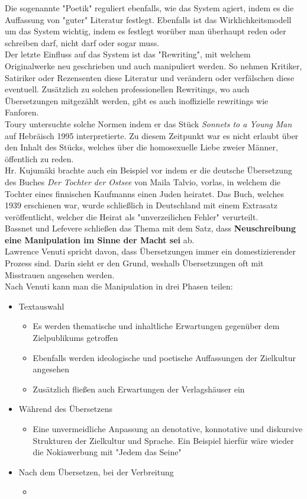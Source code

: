 \documentclass{article}
\begin{document}
	Die sogenannte "Poetik" reguliert ebenfalls, wie das System agiert, indem es die Auffassung von "guter" Literatur festlegt. Ebenfalls ist das Wirklichkeitsmodell um das System wichtig, indem es festlegt worüber man überhaupt reden oder schreiben darf, nicht darf oder sogar muss. \\
	Der letzte Einfluss auf das System ist das "Rewriting", mit welchem Originalwerke neu geschrieben und auch manipuliert werden. So nehmen Kritiker, Satiriker oder Rezensenten diese Literatur und verändern oder verfälschen diese eventuell. Zusätzlich zu solchen professionellen Rewritings, wo auch Übersetzungen mitgezählt werden, gibt es auch inoffizielle rewritings wie Fanforen. \\
	Toury untersuchte solche Normen indem er das Stück \textit{Sonnets to a Young Man} auf Hebräisch 1995 interpretierte. Zu diesem Zeitpunkt war es nicht erlaubt über den Inhalt des Stücks, welches über die homosexuelle Liebe zweier Männer, öffentlich zu reden. \\
	Hr. Kujumäki brachte auch ein Beispiel vor indem er die deutsche Übersetzung des Buches \textit{Der Tochter der Ostsee} von Maila Talvio, vorlas, in welchem die Tochter eines finnischen Kaufmanns einen Juden heiratet. Das Buch, welches 1939 erschienen war, wurde schließlich in Deutschland mit einem Extrasatz veröffentlicht, welcher die Heirat als "unverzeilichen Fehler" verurteilt. \\
	Bassnet und Lefevere schließen das Thema mit dem Satz, dass \textbf{Neuschreibung eine Manipulation im Sinne der Macht sei} ab. \\
	Lawrence Venuti spricht davon, dass Übersetzungen immer ein domestizierender Prozess sind. Darin sieht er den Grund, weshalb Übersetzungen oft mit Misstrauen angesehen werden. \\
	Nach Venuti kann man die Manipulation in drei Phasen teilen:
	\begin{itemize}
		\item{Textauswahl}
		\begin{itemize}
			\item{Es werden thematische und inhaltliche Erwartungen gegenüber dem Zielpublikums getroffen}
			\item{Ebenfalls werden ideologische und poetische Auffassungen der Zielkultur angesehen}
			\item{Zusätzlich fließen auch Erwartungen der Verlagshäuser ein}
		\end{itemize}
		\item{Während des Übersetzens}
		\begin{itemize}
			\item{Eine unvermeidliche Anpassung an denotative, konnotative und diskursive Strukturen der Zielkultur und Sprache. Ein Beispiel hierfür wäre wieder die Nokiawerbung mit "Jedem das Seine"}
		\end{itemize}
		\item{Nach dem Übersetzen, bei der Verbreitung}
		\begin{itemize}
			\item{}
		\end{itemize}
	\end{itemize}
\end{document}
